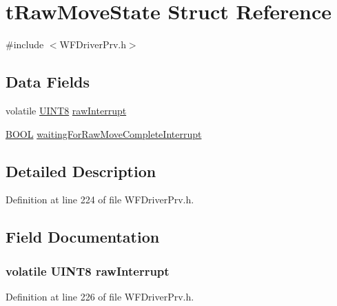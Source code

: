 \hypertarget{structt_raw_move_state}{}\section{t\+Raw\+Move\+State Struct Reference}
\label{structt_raw_move_state}


{\ttfamily \#include $<$W\+F\+Driver\+Prv.\+h$>$}

\subsection*{Data Fields}
\begin{DoxyCompactItemize}
\item 
volatile \hyperlink{_generic_type_defs_8h_ab27e9918b538ce9d8ca692479b375b6a}{U\+I\+N\+T8} \hyperlink{structt_raw_move_state_aad65b0aea4b1f394262e17943d632a6c}{raw\+Interrupt}
\item 
\hyperlink{_generic_type_defs_8h_a54d65c7fa62e62c9754371e42f5111b9}{B\+O\+O\+L} \hyperlink{structt_raw_move_state_a20b0ee3aee1aa7a07fc9616828a42df2}{waiting\+For\+Raw\+Move\+Complete\+Interrupt}
\end{DoxyCompactItemize}


\subsection{Detailed Description}


Definition at line 224 of file W\+F\+Driver\+Prv.\+h.



\subsection{Field Documentation}
\hypertarget{structt_raw_move_state_aad65b0aea4b1f394262e17943d632a6c}{}
\subsubsection[{raw\+Interrupt}]{\setlength{\rightskip}{0pt plus 5cm}volatile {\bf U\+I\+N\+T8} raw\+Interrupt}\label{structt_raw_move_state_aad65b0aea4b1f394262e17943d632a6c}


Definition at line 226 of file W\+F\+Driver\+Prv.\+h.

\hypertarget{structt_raw_move_state_a20b0ee3aee1aa7a07fc9616828a42df2}{}
